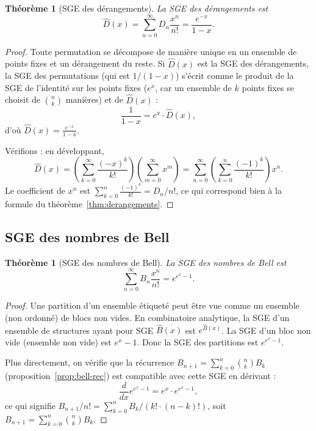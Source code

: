 \documentclass[12pt,a4paper,openany]{book}
\theoremstyle{definition}
\theoremstyle{plain}
\newtheorem{theoreme}[definition]{Théorème}
\theoremstyle{remark}
\begin{document}
\begin{theoreme}[SGE des dérangements]
\label{thm:egf-derangements}
La SGE des dérangements est
\[
  \hat{D}(x) = \sum_{n=0}^{\infty} D_n \frac{x^n}{n!} = \frac{e^{-x}}{1-x}.
\]
\end{theoreme}

\begin{proof}
Toute permutation se décompose de manière unique en un ensemble de points fixes
et un dérangement du reste. Si $\hat{D}(x)$ est la SGE des dérangements,
la SGE des permutations (qui est $1/(1-x)$) s'écrit comme le produit
de la SGE de l'identité sur les points fixes ($e^x$, car un ensemble de $k$
points fixes se choisit de $\binom{n}{k}$ manières) et de $\hat{D}(x)$ :
\[
  \frac{1}{1-x} = e^x \cdot \hat{D}(x),
\]
d'où $\hat{D}(x) = \frac{e^{-x}}{1-x}$.

Vérifions : en développant,
\[
  \hat{D}(x) = \left(\sum_{k=0}^{\infty} \frac{(-x)^k}{k!}\right)
    \left(\sum_{m=0}^{\infty} x^m\right)
  = \sum_{n=0}^{\infty} \left(\sum_{k=0}^{n} \frac{(-1)^k}{k!}\right) x^n.
\]
Le coefficient de $x^n$ est $\sum_{k=0}^n \frac{(-1)^k}{k!} = D_n/n!$,
ce qui correspond bien à la formule du théorème~\ref{thm:derangements}.
\end{proof}

\subsection{SGE des nombres de Bell}
\label{sec:egf-bell}

\begin{theoreme}[SGE des nombres de Bell]
\label{thm:egf-bell}
La SGE des nombres de Bell est
\[
  \sum_{n=0}^{\infty} B_n \frac{x^n}{n!} = e^{e^x - 1}.
\]
\end{theoreme}

\begin{proof}
Une partition d'un ensemble étiqueté peut être vue comme un ensemble
(non ordonné) de blocs non vides. En combinatoire analytique, la SGE
d'un ensemble de structures ayant pour SGE $\hat{B}(x)$ est $e^{\hat{B}(x)}$.
La SGE d'un bloc non vide (ensemble non vide) est $e^x - 1$.
Donc la SGE des partitions est $e^{e^x - 1}$.

Plus directement, on vérifie que la récurrence $B_{n+1} = \sum_{k=0}^n \binom{n}{k} B_k$
(proposition~\ref{prop:bell-rec}) est compatible avec cette SGE en dérivant :
\[
  \frac{d}{dx} e^{e^x - 1} = e^x \cdot e^{e^x - 1},
\]
ce qui signifie $B_{n+1}/n! = \sum_{k=0}^n B_k/(k! \cdot (n-k)!)$, soit
$B_{n+1} = \sum_{k=0}^n \binom{n}{k} B_k$.
\end{proof}
\end{document}
